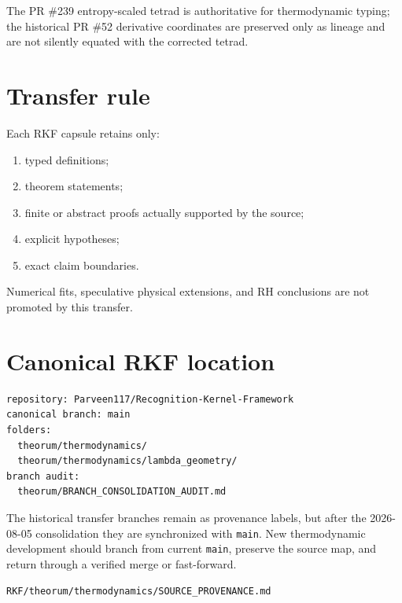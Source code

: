 The PR \#239 entropy-scaled tetrad is authoritative for thermodynamic typing; the historical PR \#52 derivative coordinates are preserved only as lineage and are not silently equated with the corrected tetrad.

\hypertarget{transfer-rule}{%
\section{Transfer rule}\label{transfer-rule}}

Each RKF capsule retains only:

\begin{enumerate}
\def\labelenumi{\arabic{enumi}.}
\tightlist
\item
  typed definitions;
\item
  theorem statements;
\item
  finite or abstract proofs actually supported by the source;
\item
  explicit hypotheses;
\item
  exact claim boundaries.
\end{enumerate}

Numerical fits, speculative physical extensions, and RH conclusions are not promoted by this transfer.

\hypertarget{canonical-rkf-location}{%
\section{Canonical RKF location}\label{canonical-rkf-location}}

\begin{verbatim}
repository: Parveen117/Recognition-Kernel-Framework
canonical branch: main
folders:
  theorum/thermodynamics/
  theorum/thermodynamics/lambda_geometry/
branch audit:
  theorum/BRANCH_CONSOLIDATION_AUDIT.md
\end{verbatim}

The historical transfer branches remain as provenance labels, but after the 2026-08-05 consolidation they are synchronized with \texttt{main}. New thermodynamic development should branch from current \texttt{main}, preserve the source map, and return through a verified merge or fast-forward.

\begin{flushright}\small\texttt{RKF/theorum/thermodynamics/SOURCE\_PROVENANCE.md}\end{flushright}
